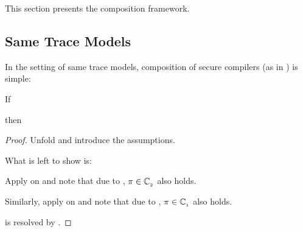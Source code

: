 \documentclass[a4paper,12pt]{article}
\begin{document}
This section presents the composition framework.

\subsection{Same Trace Models}\label{subsec:rtpc-same-trace-models}

In the setting of same trace models, composition of secure compilers (as in ) is simple:

\begin{lemma}[\Coqed]{}
  If 
  \begin{assumptions}
  \end{assumptions}
  then
  \begin{goals}
  \end{goals}
\end{lemma}
\begin{proof}
  Unfold  and introduce the assumptions. 
  \begin{passumptions}
  \end{passumptions}
  What is left to show is:
  \begin{goals}
  \end{goals}
  Apply  on  and note that due to , $\varProperty\in\varClass[_2]$ also holds.
  \begin{goals}
  \end{goals}
  Similarly, apply  on  and note that due to , $\varProperty\in\varClass[_1]$ also holds.
  \begin{goals}
  \end{goals}
   is resolved by .
\end{proof}
\end{document}
